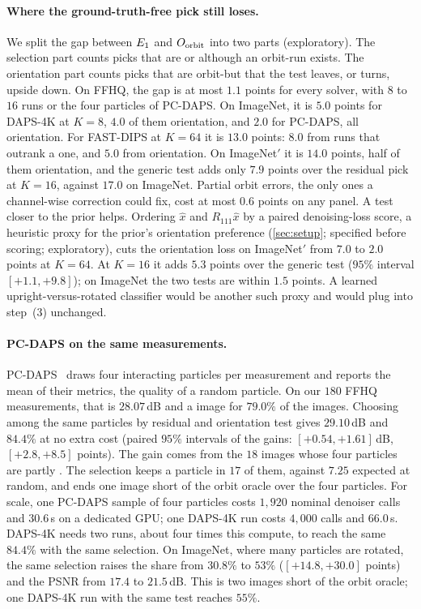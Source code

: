 \paragraph{Where the ground-truth-free pick still loses.}
We split the gap between $E_1$ and $O_{\mathrm{orbit}}$ into two parts (exploratory).
The selection part counts picks that are \cons or \incons although an orbit-\good run exists.
The orientation part counts picks that are orbit-\good but that the test leaves, or turns, upside down.
On FFHQ, the gap is at most $1.1$ points for every solver, with $8$ to $16$ runs or the four particles of PC-DAPS.
On ImageNet, it is $5.0$ points for DAPS-4K at $K{=}8$, $4.0$ of them orientation, and $2.0$ for PC-DAPS, all orientation.
For FAST-DIPS at $K{=}64$ it is $13.0$ points: $8.0$ from \cons runs that outrank a \good one, and $5.0$ from orientation.
On ImageNet$'$ it is $14.0$ points, half of them orientation, and the generic test adds only $7.9$ points over the residual pick at $K{=}16$, against $17.0$ on ImageNet.
Partial orbit errors, the only ones a channel-wise correction could fix, cost at most $0.6$ points on any panel.
A test closer to the prior helps.
Ordering $\hat x$ and $R_{111}\hat x$ by a paired denoising-loss score, a heuristic proxy for the prior's orientation preference (\cref{sec:setup}; specified before scoring; exploratory), cuts the orientation loss on ImageNet$'$ from $7.0$ to $2.0$ points at $K{=}64$.
At $K{=}16$ it adds $5.3$ points over the generic test ($95\%$ interval $[+1.1,+9.8]$); on ImageNet the two tests are within $1.5$ points.
A learned upright-versus-rotated classifier would be another such proxy and would plug into step~(3) unchanged.

\paragraph{PC-DAPS on the same measurements.}
PC-DAPS~\cite{kocabas2026pcdaps} draws four interacting particles per measurement and reports the mean of their metrics, \ie the quality of a random particle.
On our $180$ FFHQ measurements, that is $28.07$\,dB and a \good image for $79.0\%$ of the images.
Choosing among the same particles by residual and orientation test gives $29.10$\,dB and $84.4\%$ at no extra cost (paired $95\%$ intervals of the gains: $[+0.54,+1.61]$\,dB, $[+2.8,+8.5]$ points).
The gain comes from the $18$ images whose four particles are partly \good.
The selection keeps a \good particle in $17$ of them, against $7.25$ expected at random, and ends one image short of the orbit oracle over the four particles.
For scale, one PC-DAPS sample of four particles costs $1{,}920$ nominal denoiser calls and $30.6$\,s on a dedicated GPU; one DAPS-4K run costs $4{,}000$ calls and $66.0$\,s.
DAPS-4K needs two runs, about four times this compute, to reach the same $84.4\%$ with the same selection.
On ImageNet, where many particles are rotated, the same selection raises the share from $30.8\%$ to $53\%$ ($[+14.8,+30.0]$ points) and the PSNR from $17.4$ to $21.5$\,dB.
This is two images short of the orbit oracle; one DAPS-4K run with the same test reaches $55\%$.
